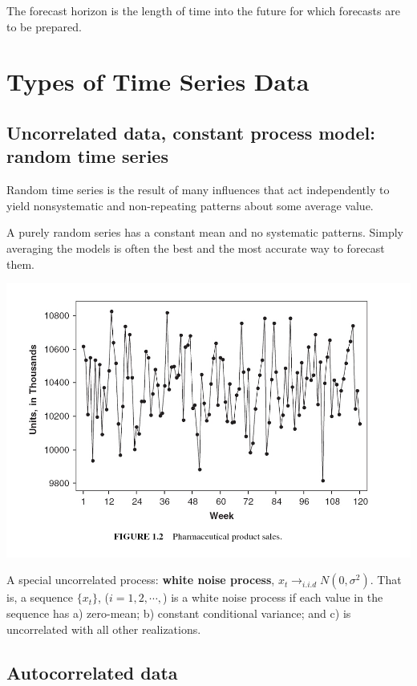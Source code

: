 \documentclass[
]{book}
\begin{document}
The forecast horizon is the length of time into the future for which forecasts are to be prepared.

\hypertarget{types-of-time-series-data}{%
\section{Types of Time Series Data}\label{types-of-time-series-data}}

\hypertarget{uncorrelated-data-constant-process-model-random-time-series}{%
\subsection{Uncorrelated data, constant process model: random time series}\label{uncorrelated-data-constant-process-model-random-time-series}}

Random time series is the result of many influences that act independently to yield nonsystematic and non-repeating patterns about some average value.

A purely random series has a constant mean and no systematic patterns. Simply averaging the models is often the best and the most accurate way to forecast them.

\begin{center}\includegraphics[width=0.8\linewidth]{img11/w11-Figure02} \end{center}

A special uncorrelated process: \textbf{white noise process}, \(x_t \to_{i.i.d} N(0, \sigma^2)\). That is, a sequence \(\{x_t\}\), (\(i = 1, 2, \cdots,\)) is a white noise process if each value in the sequence has a) zero-mean; b) constant conditional variance; and c) is uncorrelated with all other realizations.

\hypertarget{autocorrelated-data}{%
\subsection{Autocorrelated data}\label{autocorrelated-data}}
\end{document}
